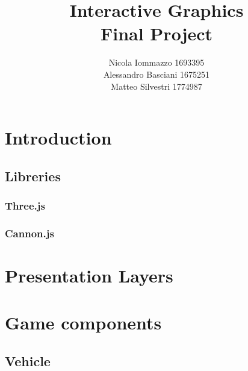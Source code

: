 \documentclass[a4paper,11pt, titlepage]{report}
\begin{document}
\hypersetup{
	linkcolor=black,
	citecolor=black,
	urlcolor=black
}

\title{
	Interactive Graphics\\
	\large Final Project
	}
\author{Nicola Iommazzo 1693395\\
		Alessandro Basciani 1675251\\
		Matteo Silvestri 1774987\\ }
\date{}
\maketitle

\tableofcontents

%
%

\chapter{Introduction}
	
	\section{Libreries}

		\subsection{Three.js}

		\subsection{Cannon.js}

\chapter{Presentation Layers}

\chapter{Game components}

	\section{Vehicle}
		
\end{document}
